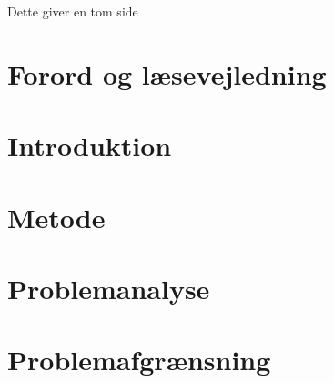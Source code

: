 

\raggedbottom





\frontmatter

\clearpage
\thispagestyle{empty}
{\color{white}Dette giver en tom side}
\clearpage



\chapter*{Forord og læsevejledning}\vspace{-.75cm}


\newpage


\tableofcontents* 

\mainmatter

\chapter{Introduktion}\vspace{-.75cm} \label{introduktion}


\chapter{Metode}\vspace{-.75cm}


\chapter{Problemanalyse}\vspace{-.75cm} \label{problemanalysen}





\chapter{Problemafgrænsning}\vspace{-.75cm}



